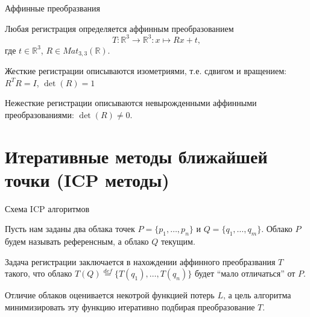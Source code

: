 \documentclass[6pt,pdf,utf8,russian]{beamer}
\begin{document}
\begin{frame}[fragile]{Аффинные преобразвания}
    \begin{block}{}
        Любая регистрация определяется аффинным преобразованием
        \[
            T:\mathbb{R}^3\to\mathbb{R}^3:x \mapsto R x + t,
        \]
        где $t\in\mathbb{R}^3$, $R\in Mat_{3,3}(\mathbb{R})$.
    \end{block}

    \pause

    \begin{block}{}
        Жесткие регистрации описываются изометриями, т.е. сдвигом и вращением: $R^TR=I$, $\det(R)=1$
    \end{block}

    \pause

    \begin{block}{}
        Нежесткие регистрации описываются невырожденными аффинными преобразованиями: $\det(R)\neq 0$.
    \end{block}

\end{frame}

\section{Итеративные методы ближайшей точки (ICP методы)}

\begin{frame}[fragile]{Схема ICP алгоритмов}
    \begin{block}{}
        Пусть нам заданы два облака точек $P=\{p_1,\ldots,p_n\}$ и $Q=\{q_1,\ldots,q_m\}$.
        Облако $P$ будем называть референсным, а облако $Q$ текущим.
    \end{block}

    \pause

    \begin{block}{}
        Задача регистрации заключается в нахождении аффинного преобразвания $T$ такого, что облако
        $T(Q)\stackrel{def}{=}\{T(q_1),\ldots,T(q_n)\}$ будет ``мало отличаться'' от $P$.
    \end{block}

    \begin{block}{}
        Отличие облаков оценивается некотрой функцией потерь $L$, а цель алгоритма 
        минимизировать эту функцию итеративно подбирая преобразование $T$.
    \end{block}

\end{frame}
\end{document}
